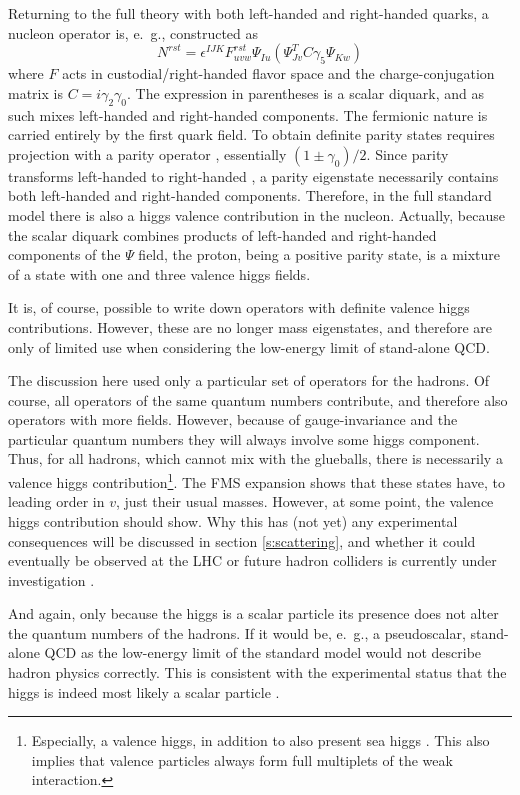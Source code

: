 \documentclass[final,twoside,12pt]{article}
\newcommand*{\no}{\noindent}
\newcommand*{\be}{\begin{equation}}
\newcommand*{\ee}{\end{equation}}
\newcommand*{\1}{1\!\!\!\bot}
\begin{document}
Returning to the full theory with both left-handed and right-handed quarks, a nucleon operator is, e.\ g., constructed as \cite{Gattringer:2010zz}
\be
N^{rst}=\epsilon^{IJK}F^{rst}_{uvw}\Psi_{Iu}\left(\Psi^T_{Jv}C\gamma_5\Psi_{Kw}\right)\label{nucleon}
\ee
\no where $F$ acts in custodial/right-handed flavor space and the charge-conjugation matrix is $C=i\gamma_2\gamma_0$. The expression in parentheses is a scalar diquark, and as such mixes left-handed and right-handed components. The fermionic nature is carried entirely by the first quark field. To obtain definite parity states requires projection with a parity operator \cite{Gattringer:2010zz}, essentially $(1\pm\gamma_0)/2$. Since parity transforms left-handed to right-handed \cite{Itzykson:1980rh}, a parity eigenstate necessarily contains both left-handed and right-handed components. Therefore, in the full standard model there is also a higgs valence contribution in the nucleon. Actually, because the scalar diquark combines products of left-handed and right-handed components of the $\Psi$ field, the proton, being a positive parity state, is a mixture of a state with one and three valence higgs fields.

It is, of course, possible to write down operators with definite valence higgs contributions. However, these are no longer mass eigenstates, and therefore are only of limited use when considering the low-energy limit of stand-alone QCD.

The discussion here used only a particular set of operators for the hadrons. Of course, all operators of the same quantum numbers contribute, and therefore also operators with more fields. However, because of gauge-invariance and the particular quantum numbers they will always involve some higgs component. Thus, for all hadrons, which cannot mix with the glueballs, there is necessarily a valence higgs contribution\footnote{Especially, a valence higgs, in addition to also present sea higgs \cite{Bauer:2017isx,Bauer:2018arx,Bauer:2018xag}. This also implies that valence particles always form full multiplets of the weak interaction.}. The FMS expansion shows that these states have, to leading order in $v$, just their usual masses. However, at some point, the valence higgs contribution should show. Why this has (not yet) any experimental consequences will be discussed in section \ref{s:scattering}, and whether it could eventually be observed at the LHC or future hadron colliders is currently under investigation \cite{Fernbach:unpublished}.

And again, only because the higgs is a scalar particle its presence does not alter the quantum numbers of the hadrons. If it would be, e.\ g., a pseudoscalar, stand-alone QCD as the low-energy limit of the standard model would not describe hadron physics correctly. This is consistent with the experimental status that the higgs is indeed most likely a scalar particle \cite{Aad:2015mxa,Aad:2013xqa,pdg}.
\end{document}

